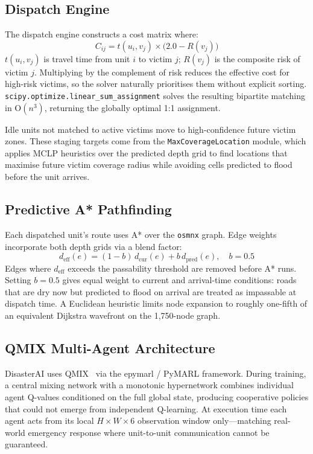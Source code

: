 \documentclass[conference]{IEEEtran}
\begin{document}
\subsection{Dispatch Engine}

The dispatch engine constructs a cost matrix where:
\begin{equation}
  C_{ij} = t(u_i, v_j) \times \bigl(2.0 - R(v_j)\bigr)
  \label{eq:cost}
\end{equation}
$t(u_i, v_j)$ is travel time from unit $i$ to victim $j$; $R(v_j)$ is the
composite risk of victim $j$.
Multiplying by the complement of risk reduces the effective cost for
high-risk victims, so the solver naturally prioritises them without
explicit sorting.
\texttt{scipy.optimize.linear\_sum\_assignment} solves the resulting bipartite
matching in O$(n^3)$, returning the globally optimal 1:1 assignment.

Idle units not matched to active victims move to high-confidence future victim
zones. These staging targets come from the \texttt{MaxCoverage\-Location}
module, which applies MCLP heuristics over the predicted depth grid to find
locations that maximise future victim coverage radius while avoiding
cells predicted to flood before the unit arrives.

\subsection{Predictive A* Pathfinding}

Each dispatched unit's route uses A* over the \texttt{osmnx} graph.
Edge weights incorporate both depth grids via a blend factor:
\begin{equation}
  d_\text{eff}(e) = (1 - b)\,d_\text{cur}(e) + b\,d_\text{pred}(e),\quad b = 0.5
  \label{eq:blend}
\end{equation}
Edges where $d_\text{eff}$ exceeds the passability threshold are removed before
A* runs.
Setting $b = 0.5$ gives equal weight to current and arrival-time conditions:
roads that are dry now but predicted to flood on arrival are treated as
impassable at dispatch time.
A Euclidean heuristic limits node expansion to roughly one-fifth of an
equivalent Dijkstra wavefront on the 1,750-node graph.

\subsection{QMIX Multi-Agent Architecture}

DisasterAI uses QMIX~\cite{rashid2018qmix} via the epymarl / PyMARL framework.
During training, a central mixing network with a monotonic hypernetwork
combines individual agent Q-values conditioned on the full global state,
producing cooperative policies that could not emerge from independent
Q-learning.
At execution time each agent acts from its local $H \times W \times 6$
observation window only---matching real-world emergency response where
unit-to-unit communication cannot be guaranteed.
\end{document}
